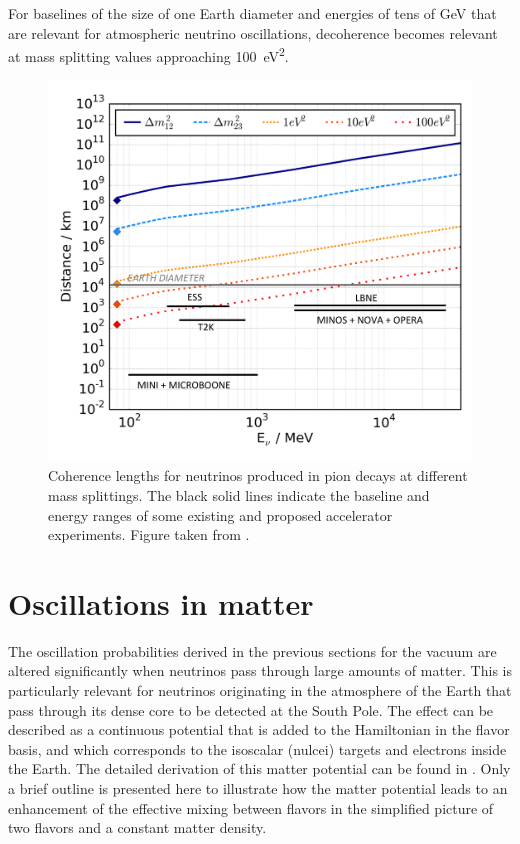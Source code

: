 For baselines of the size of one Earth diameter and energies of tens of GeV that are relevant for atmospheric neutrino oscillations, decoherence becomes relevant at mass splitting values approaching \SI{100}{\electronvolt\squared}.
\begin{figure}
    \centering
    \includegraphics[width=0.8\linewidth]{figures/theory/VariousPionBeams.pdf}
    \caption{Coherence lengths for neutrinos produced in pion decays at different mass splittings. The black solid lines indicate the baseline and energy ranges of some existing and proposed accelerator experiments. Figure taken from \cite{atmo_decoherence}.\label{fig:decoh-jones}}
\end{figure}

\section{Oscillations in matter}
\label{sec:matter-oscillations}
The oscillation probabilities derived in the previous sections for the vacuum are altered significantly when neutrinos pass through large amounts of matter.
This is particularly relevant for neutrinos originating in the atmosphere of the Earth that pass through its dense core to be detected at the South Pole.
The effect can be described as a continuous potential that is added to the Hamiltonian in the flavor basis, and which corresponds to the isoscalar (nulcei) targets and electrons inside the Earth.
The detailed derivation of this matter potential can be found in .
Only a brief outline is presented here to illustrate how the matter potential leads to an enhancement of the effective mixing between flavors in the simplified picture of two flavors and a constant matter density.

